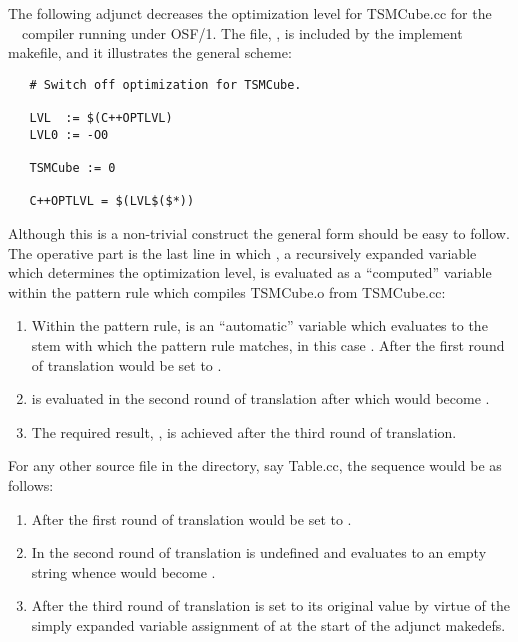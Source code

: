 The following adjunct  decreases the optimization level for
TSMCube.cc for the \gnu\ \cplusplus\ compiler running under \textsc{OSF/1}.
The file, , is included
by the implement makefile, and it illustrates the general scheme:

\begin{verbatim}
   # Switch off optimization for TSMCube.
 
   LVL  := $(C++OPTLVL)
   LVL0 := -O0
 
   TSMCube := 0
 
   C++OPTLVL = $(LVL$($*))
\end{verbatim}

\noindent
Although this is a non-trivial construct the general form should be easy to
follow.  The operative part is the last line in which , a
recursively expanded  variable which determines the \cplusplus
optimization level, is evaluated as a ``computed'' variable within the pattern
rule which compiles TSMCube.o from TSMCube.cc:

\begin{enumerate}
   \item Within the pattern rule, \code{\$*} is an ``automatic'' variable
         which evaluates to the stem with which the pattern rule matches, in
         this case .  After the first round of translation
          would be set to .

   \item {} is evaluated in the second round of translation
         after which  would become .

   \item The required result, , is achieved after the
         third round of translation.
\end{enumerate}

\noindent
For any other source file in the 
directory, say Table.cc, the sequence would be as follows:
 
\begin{enumerate}
   \item After the first round of translation  would be set to
         .
 
   \item In the second round of translation  is undefined and
         evaluates to an empty string whence  would become
         .
 
   \item After the third round of translation  is set to its
         original value by virtue of the simply expanded variable assignment
         of  at the start of the adjunct makedefs.
\end{enumerate}

